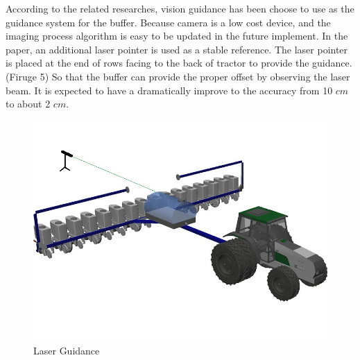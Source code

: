 \documentclass[12pt]{article}
\begin{document}
\begin{flushleft}
According to the related researches, vision guidance has been choose to use as the guidance system for the buffer. Because camera is a low cost device, and the imaging process algorithm is easy to be updated in the future implement. In the paper, an additional laser pointer is used as a stable reference. The laser pointer is placed at the end of rows facing to the back of tractor to provide the guidance. (Firuge 5) So that the buffer can provide the proper offset by observing the laser beam. It is expected to have a dramatically improve to the accuracy from 10 $cm$ to about 2 $cm$. 
\begin{figure}[ht!]
	\begin{center}
		\includegraphics[scale = 0.6]{tractor.jpg}
		\caption{Laser Guidance}
	\end{center}
\end{figure}





\end{flushleft}
\end{document}
